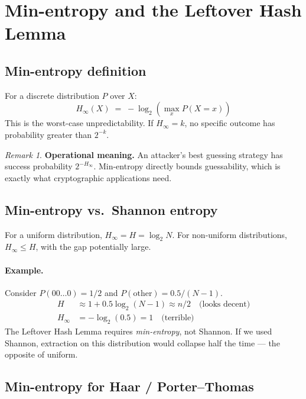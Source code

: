 \documentclass[11pt,a4paper]{article}
\theoremstyle{plain}
\theoremstyle{definition}
\theoremstyle{remark}
\newtheorem*{remark}{Remark}
\newcommand{\Hmin}{H_{\infty}}
\begin{document}
\section{Min-entropy and the Leftover Hash Lemma}

\subsection{Min-entropy definition}

For a discrete distribution $P$ over $X$:
\begin{equation}
\Hmin(X) \;=\; -\log_2\!\left(\max_x P(X = x)\right)
\end{equation}
This is the worst-case unpredictability. If $\Hmin = k$, no specific outcome has probability greater than $2^{-k}$.

\begin{remark}
\textbf{Operational meaning.} An attacker's best guessing strategy has success probability $2^{-\Hmin}$. Min-entropy directly bounds guessability, which is exactly what cryptographic applications need.
\end{remark}

\subsection{Min-entropy vs.\ Shannon entropy}

For a uniform distribution, $\Hmin = H = \log_2 N$. For non-uniform distributions, $\Hmin \leq H$, with the gap potentially large.

\paragraph{Example.} Consider $P(00\ldots0) = 1/2$ and $P(\text{other}) = 0.5/(N-1)$.
\begin{align}
H &\approx 1 + 0.5 \log_2(N-1) \approx n/2 \quad\text{(looks decent)} \\
\Hmin &= -\log_2(0.5) = 1 \quad\text{(terrible)}
\end{align}
The Leftover Hash Lemma requires \emph{min-entropy}, not Shannon. If we used Shannon, extraction on this distribution would collapse half the time --- the opposite of uniform.

\subsection{Min-entropy for Haar / Porter--Thomas}
\end{document}
